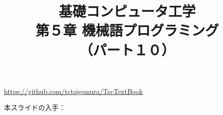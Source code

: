 \documentclass{beamer}                 %
\begin{document}
\title{基礎コンピュータ工学\\第５章 機械語プログラミング\\（パート１０）}
\date{}

\begin{frame}
  \titlepage
  \centerline{\url{https://github.com/tctsigemura/TecTextBook}}
  \vfill
  \centerline{本スライドの入手：
    }
\end{frame}

\end{document}
